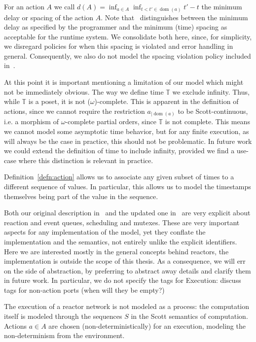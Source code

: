 For an action $A$ we call $d(A) = \operatorname{inf}_{a \in A} \operatorname{inf}_{t < t' \in \operatorname{dom}(a)} t' - t$ the minimum delay or spacing of the action $A$.
Note that~\cite{lohstroh_phdthesis} distinguishes between the minimum delay as specified by the programmer and the minimum (time) spacing as acceptable for the runtime system.
We consolidate both here, since, for simplicity, we disregard policies for when this spacing is violated and error handling in general.
Consequently, we also do not model the spacing violation policy included in~\cite{lohsroh_phdthesis}. 

At this point it is important mentioning a limitation of our model which might not be immediately obvious.
The way we define time $\mathbb{T}$ we exclude infinity. Thus, while $\mathbb{T}$ is a \ac{poset}, it is not ($\omega$)-complete.
This is apparent in the definition of actions, since we cannot require the restriction $a_{\big| \operatorname{dom}(a)}$ to be Scott-continuous, i.e. a morphism of $\omega$-complete partial orders, since $\mathbb{T}$ is not complete. 
This means we cannot model some asymptotic time behavior, but for any finite execution, as will always be the case in practice, this should not be problematic.
In future work we could extend the definition of time to include infinity, provided we find a use-case where this distinction is relevant in practice.

Definition~\ref{defn:action} allows us to associate any given subset of times to a different sequence of values.
In particular, this allows us to model the timestamps themselves being part of the value in the sequence.

Both our original description in~\cite{lohstroph_cyphy19} and the updated one in~\cite{lohstroh_phdthesis} are very explicit about reaction and event queues, scheduling and mutexes.
These are very important aspects for any implementation of the model, yet they conflate the implementation and the semantics, not entirely unlike the explicit identifiers.
Here we are interested mostly in the general concepts behind reactors, the implementation is outside the scope of this thesis.
As a consequence, we will err on the side of abstraction, by preferring to abstract away details and clarify them in future work. 
In particular, we do not specify the tags for 
Execution: discuss tags for non-action ports (when will they be empty?)

The execution of a reactor network is not modeled as a process: the computation itself is modeled through the sequences $S$ in the Scott semantics of computation.
Actions $a \in A$ are chosen (non-deterministically) for an execution, modeling the non-determinism from the environment.

